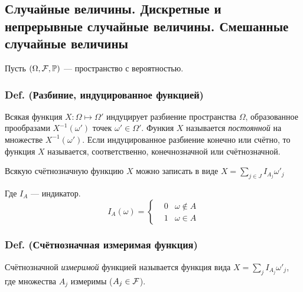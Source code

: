 \subsection{Случайные величины. Дискретные и непрерывные случайные
величины. Смешанные случайные
величины}\label{ux441ux43bux443ux447ux430ux439ux43dux44bux435-ux432ux435ux43bux438ux447ux438ux43dux44b.-ux434ux438ux441ux43aux440ux435ux442ux43dux44bux435-ux438-ux43dux435ux43fux440ux435ux440ux44bux432ux43dux44bux435-ux441ux43bux443ux447ux430ux439ux43dux44bux435-ux432ux435ux43bux438ux447ux438ux43dux44b.-ux441ux43cux435ux448ux430ux43dux43dux44bux435-ux441ux43bux443ux447ux430ux439ux43dux44bux435-ux432ux435ux43bux438ux447ux438ux43dux44b}

Пусть \((\Omega, \mathcal F, \mathbb P)\) --- пространство с вероятностью.

\subsubsection{Def. (Разбиние, индуцированное
функцией)}\label{def.-ux440ux430ux437ux431ux438ux43dux438ux435-ux438ux43dux434ux443ux446ux438ux440ux43eux432ux430ux43dux43dux43eux435-ux444ux443ux43dux43aux446ux438ux435ux439}

Всякая функция \(X : \Omega\mapsto\Omega\prime\) индуцирует разбиение
пространства \(\Omega\), образованное прообразами
\(X^{-1}(\omega\prime)\) точек \(\omega\prime\in\Omega\prime\). Функия
\(X\) называется \emph{постоянной} на множестве
\(X^{-1}(\omega\prime)\). Если индуцированное разбиение конечно или
счётно, то функция \(X\) называется, соответственно, конечнозначной или
счётнозначной.

Всякую счётнозначную функцию \(X\) можно записать в виде
\(X = \sum_{j\in J} I_{A_j} \omega\prime_j\)

Где \(I_A\) --- индикатор. \[
  I_A(\omega) =
  \left\{
  \begin{aligned}
    & 0 & \omega \notin A \\
    & 1 & \omega \in A
  \end{aligned}
  \right.
\]

\subsubsection{Def. (Счётнозначная измеримая
функция)}\label{def.-ux441ux447ux451ux442ux43dux43eux437ux43dux430ux447ux43dux430ux44f-ux438ux437ux43cux435ux440ux438ux43cux430ux44f-ux444ux443ux43dux43aux446ux438ux44f}

Счётнозначной \emph{измеримой} функцией называется функция вида
\hbox{$X = \sum_j I_{A_j}\omega\prime_j$}, где множества \(A_j\)
измеримы (\(A_j \in \mathcal F\)).

